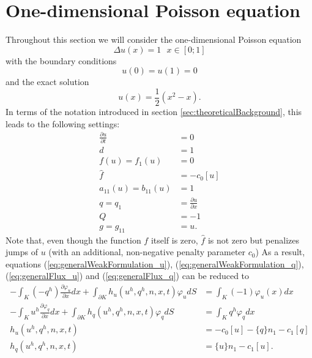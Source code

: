 \section{One-dimensional Poisson equation}
\label{sec:poission1d}
Throughout this section we will consider the one-dimensional Poisson equation
\begin{equation}
	\Delta u(x) = 1 ~~~ x \in [0;1]
\label{eq:poisson}
\end{equation}
with the boundary conditions
\begin{equation}
	u(0) = u(1) = 0
\label{eq:poissonBoundaryCondition}
\end{equation}
and the exact solution
\begin{equation}
	u(x) = \frac{1}{2} (x^2 - x).
\label{eq:poissonExactSolution}
\end{equation}
In terms of the notation introduced in section \ref{sec:theoreticalBackground},
this leads to the following settings:
\begin{align}
  \frac{\partial u}{\partial t} &= 0\\
  d &= 1\\
  f(u) = f_1(u) &= 0\\
  \hat{f} &= -c_0 [u]\\
  a_{11}(u) = b_{11}(u) &= 1\\
  q = q_1 &= \frac{\partial u}{\partial x}\\
  Q &= -1\\
  g = g_{11} &= u.
\end{align}
Note that, even though the function $f$ itself is zero, $\hat{f}$ is not zero
but penalizes jumps of $u$ (with an additional, non-negative penalty parameter 
$c_0$) As a result, equations (\ref{eq:generalWeakFormulation_u}), 
(\ref{eq:generalWeakFormulation_q}), (\ref{eq:generalFlux_u}) and 
(\ref{eq:generalFlux_q}) can be reduced to
\begin{align}
  \label{equ:poisson_u_equation}
	- \int_K {(-q^h) \frac{\partial \varphi_u}{\partial x} dx}
	+ \int_{\partial K} {h_u(u^h, q^h, n, x, t) \varphi_u dS}
	&= \int_K {(-1) \varphi_u(x) dx}
	\\
  \label{equ:poisson_q_equation}
	- \int_K {u^h \frac{\partial \varphi_q}{\partial x} dx}
	+ \int_{\partial K} {h_{q}(u^h, q^h, n, x, t) \varphi_q dS}
	&= \int_K {q^h \varphi_{q} dx}
	\\
  \label{equ:poisson_u_flux}
	h_u(u^h, q^h, n, x, t)
	&= -c_0 [u]
	- \{q\}n_1
	- c_{1} [q]
	\\
  \label{equ:poisson_q_flux}
  h_{q}(u^h, q^h, n, x, t)
  &= \{u\}n_1
  - c_{1}[u].
\end{align}


